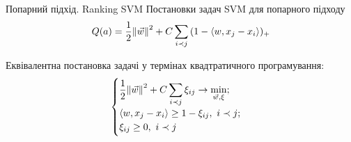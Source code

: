 \documentclass[10pt]{beamer}
\newcommand{\ip}[2]{{\langle #1, #2 \rangle}}
\begin{document}
\begin{frame}{Попарний підхід. Ranking SVM}
Постановки задач SVM для попарного підходу
\begin{equation}
Q(a) = \frac{1}{2}\norm{\vec{w}}^{2} + C\sum_{i \prec j}{(1 - \ip{w}{x_{j} - x_{i}})_{+}}
\end{equation}

Еквівалентна постановка задачі у термінах квадтратичного програмування:
\[
\begin{cases}
\displaystyle
\frac{1}{2}\norm{\vec{w}}^{2} + C\sum_{i \prec j}{\xi_{ij}} \rightarrow \min_{\vec{w}, \xi}; \\
\ip{w}{x_{j} - x_{i}} \geq 1 - \xi_{ij},~i \prec j;\\
\xi_{ij} \geq 0,~ i \prec j\\
\end{cases}
\]

\end{frame}
\end{document}

